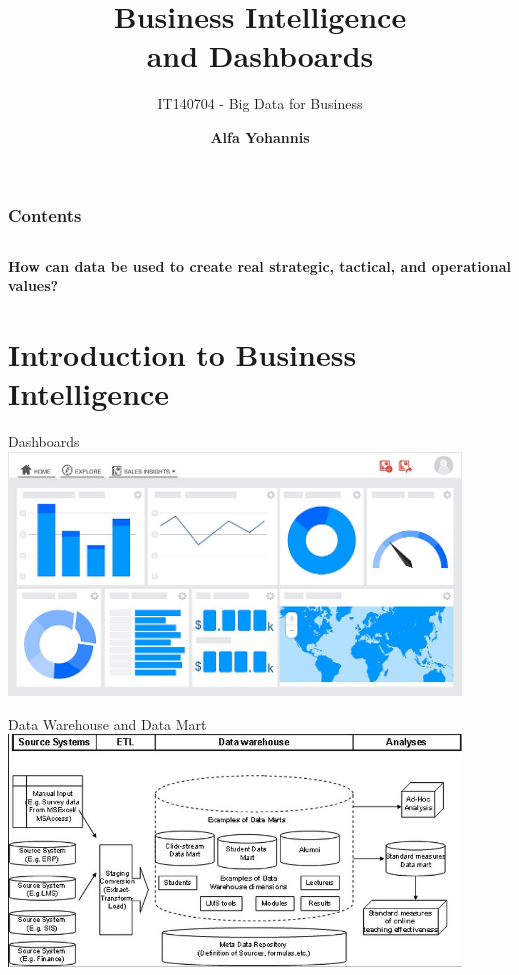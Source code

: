 \documentclass[aspectratio=169, table]{beamer}
\title{\Huge Business Intelligence \\
\vspace{10pt}
and Dashboards}
\subtitle{IT140704 - Big Data for Business}
\author{\textbf{Alfa Yohannis}}
\begin{document}
\frame{\titlepage}


\begin{frame}[fragile]
\frametitle{Contents}
\vspace{20pt}
\begin{columns}[t]
	\tableofcontents[sections={1-5}]
	
	\tableofcontents[sections={6-20}]
\end{columns}
\end{frame}

\begin{frame}{\hfill}
	\centering
	\Huge{\textbf{How can data be used to create real strategic, tactical, and operational values?}}
\end{frame}


\section{Introduction to Business Intelligence}


\begin{frame}{Dashboards}
	\vspace{20pt}
	\centering
	\includegraphics[width=0.9\textwidth]{figures/dashboard.jpg}
\end{frame}


\begin{frame}{Data Warehouse and Data Mart}
	\vspace{20pt}
	\centering
	\includegraphics[width=0.9\textwidth]{figures/datamart.jpg}
\end{frame}
\end{document}
